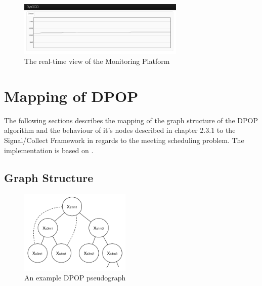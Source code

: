 \begin{figure}[H]
\includegraphics[width=300px]{graphics/monitoring}
\centering
\caption{The real-time view of the Monitoring Platform}
\label{fig:monitoring}
\end{figure}

\section{Mapping of DPOP}

The following sections describes the mapping of the graph structure of the DPOP algorithm and the behaviour of it's nodes described in chapter 2.3.1 to the Signal/Collect Framework  in regards to the meeting scheduling problem. The implementation is based on \cite{Petcu2003}.

\subsection{Graph Structure}
\begin{figure}[h]
\includegraphics[width=200px]{graphics/dpop_graph}
\centering
\caption{An example DPOP pseudograph}
\label{fig:dpop_graph}
\end{figure}

